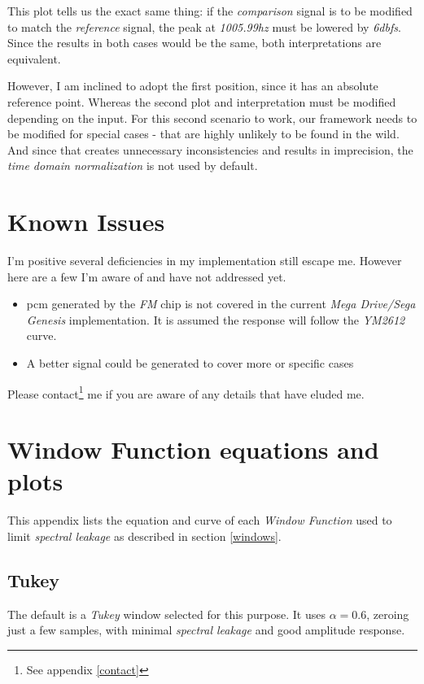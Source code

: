 \documentclass[10pt,a4paper]{report}
\newcommand{\fhz}[1]{\textit{#1\acrshort{hz}}}
\newcommand{\db}[1]{\textit{#1\acrshort{dbfs}}}
\begin{document}
\begin{appendices}
This plot tells us the exact same thing: if the \textit{comparison} signal is to be modified to match the \textit{reference} signal, the peak at \fhz{1005.99} must be lowered by \db{6}. Since the results in both cases would be the same, both interpretations are equivalent.
	
However, I am inclined to adopt the first position, since it has an absolute reference point. Whereas the second plot and interpretation must be modified depending on the input. For this second scenario to work, our framework needs to be modified for special cases - that are highly unlikely to be found in the wild. And since that creates unnecessary inconsistencies and results in imprecision, the \textit{time domain normalization} is not used by default.

\chapter{Known Issues}

I'm positive several deficiencies in my implementation still escape me. However here are a few I'm aware of and have not addressed yet.

\begin{itemize}
	\item \acrshort{pcm} generated by the \textit{FM} chip is not covered in the current \textit{Mega Drive/Sega Genesis} implementation. It is assumed the response will follow the \textit{YM2612} curve.
	\item A better signal could be generated to cover more or specific cases
\end{itemize}

Please contact\footnote{See appendix \ref{contact}} me if you are aware of any details that have eluded me.

\chapter{Window Function equations and plots}
\label{windowfunctiondetails}

This appendix lists the equation and curve of each \textit{Window Function} used to limit \textit{spectral leakage} as described in section \ref{windows}.

\section{Tukey}

The default is a \textit{Tukey} window selected for this purpose. It uses $\alpha = 0.6$, zeroing just a few samples, with minimal \textit{spectral leakage} and good amplitude response.


\end{appendices}
\end{document}
